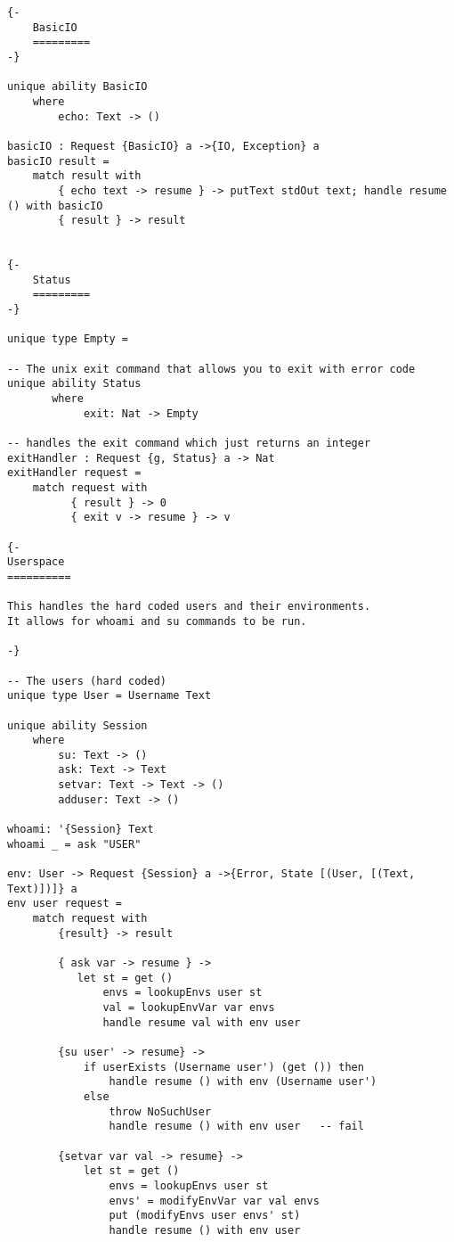 \documentclass[logo,bsc,singlespacing,parskip]{infthesis}
\begin{document}
\begin{lstlisting}[language=unison]
{-
    BasicIO
    =========
-}

unique ability BasicIO
    where
        echo: Text -> ()

basicIO : Request {BasicIO} a ->{IO, Exception} a
basicIO result =
    match result with
        { echo text -> resume } -> putText stdOut text; handle resume () with basicIO
        { result } -> result


{-
    Status
    =========
-}

unique type Empty = 

-- The unix exit command that allows you to exit with error code
unique ability Status
       where
            exit: Nat -> Empty

-- handles the exit command which just returns an integer
exitHandler : Request {g, Status} a -> Nat
exitHandler request =
    match request with
          { result } -> 0
          { exit v -> resume } -> v

{-
Userspace
==========

This handles the hard coded users and their environments.
It allows for whoami and su commands to be run.

-}

-- The users (hard coded)
unique type User = Username Text

unique ability Session
    where
        su: Text -> ()
        ask: Text -> Text
        setvar: Text -> Text -> ()
        adduser: Text -> ()

whoami: '{Session} Text
whoami _ = ask "USER"

env: User -> Request {Session} a ->{Error, State [(User, [(Text, Text)])]} a
env user request = 
    match request with
        {result} -> result

        { ask var -> resume } -> 
           let st = get ()
               envs = lookupEnvs user st
               val = lookupEnvVar var envs
               handle resume val with env user

        {su user' -> resume} -> 
            if userExists (Username user') (get ()) then
                handle resume () with env (Username user')
            else
                throw NoSuchUser
                handle resume () with env user   -- fail

        {setvar var val -> resume} -> 
            let st = get ()
                envs = lookupEnvs user st
                envs' = modifyEnvVar var val envs
                put (modifyEnvs user envs' st) 
                handle resume () with env user


\end{lstlisting}
\end{document}
